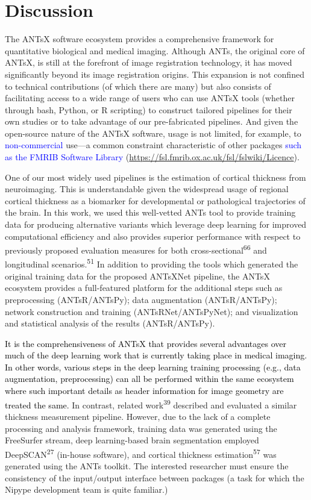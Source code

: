 \documentclass[
  12pt,
]{article}
\begin{document}
\hypertarget{discussion}{%
\section*{Discussion}\label{discussion}}

The ANTsX software ecosystem provides a comprehensive framework for
quantitative biological and medical imaging. Although ANTs, the original
core of ANTsX, is still at the forefront of image registration
technology, it has moved significantly beyond its image registration
origins. This expansion is not confined to technical contributions (of
which there are many) but also consists of facilitating access to a wide
range of users who can use ANTsX tools (whether through bash, Python, or
R scripting) to construct tailored pipelines for their own studies or to
take advantage of our pre-fabricated pipelines. And given the
open-source nature of the ANTsX software, usage is not limited, for
example, to \textcolor{blue}{non-commercial} use---a common constraint
characteristic of other packages
\textcolor{blue}{such as the FMRIB Software Library}
(\url{https://fsl.fmrib.ox.ac.uk/fsl/fslwiki/Licence}).

One of our most widely used pipelines is the estimation of cortical
thickness from neuroimaging. This is understandable given the widespread
usage of regional cortical thickness as a biomarker for developmental or
pathological trajectories of the brain. In this work, we used this
well-vetted ANTs tool to provide training data for producing alternative
variants which leverage deep learning for improved computational
efficiency and also provides superior performance with respect to
previously proposed evaluation measures for both
cross-sectional\textsuperscript{66} and longitudinal
scenarios.\textsuperscript{51} In addition to providing the tools which
generated the original training data for the proposed ANTsXNet pipeline,
the ANTsX ecosystem provides a full-featured platform for the additional
steps such as preprocessing (ANTsR/ANTsPy); data augmentation
(ANTsR/ANTsPy); network construction and training (ANTsRNet/ANTsPyNet);
and visualization and statistical analysis of the results
(ANTsR/ANTsPy).

\textcolor{black}{It is the comprehensiveness of ANTsX that provides several
advantages over much of the deep learning work that is currently taking place in
medical imaging. In other words, various steps in the deep learning training
processing (e.g., data augmentation, preprocessing) can all be performed within
the same ecosystem where such important details as header information for image
geometry are treated the same.} In contrast, related
work\textsuperscript{39} described and evaluated a similar thickness
measurement pipeline. However, due to the lack of a complete processing
and analysis framework, training data was generated using the FreeSurfer
stream, deep learning-based brain segmentation employed
DeepSCAN\textsuperscript{27} (in-house software), and cortical thickness
estimation\textsuperscript{57} was generated using the ANTs toolkit. The
interested researcher must ensure the consistency of the input/output
interface between packages (a task for which the Nipype development team
is quite familiar.)
\end{document}
